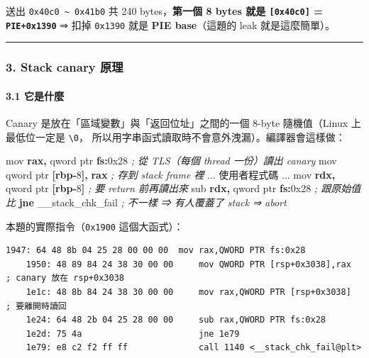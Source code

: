 \documentclass[10pt,a4paper]{article}
\newenvironment{Shaded}{\begin{snugshade}}{\end{snugshade}}
\newcommand{\BaseNTok}[1]{\textcolor[rgb]{0.00,0.00,0.81}{#1}}
\newcommand{\BuiltInTok}[1]{#1}
\newcommand{\CommentTok}[1]{\textcolor[rgb]{0.56,0.35,0.01}{\textit{#1}}}
\newcommand{\ControlFlowTok}[1]{\textcolor[rgb]{0.13,0.29,0.53}{\textbf{#1}}}
\newcommand{\DataTypeTok}[1]{\textcolor[rgb]{0.13,0.29,0.53}{#1}}
\newcommand{\DecValTok}[1]{\textcolor[rgb]{0.00,0.00,0.81}{#1}}
\newcommand{\KeywordTok}[1]{\textcolor[rgb]{0.13,0.29,0.53}{\textbf{#1}}}
\newcommand{\NormalTok}[1]{#1}
\newcommand{\OperatorTok}[1]{\textcolor[rgb]{0.81,0.36,0.00}{\textbf{#1}}}
\renewenvironment{Shaded}{%
  \def\FrameCommand{\fboxsep=3.2pt\colorbox{shadecolor}}%
  \MakeFramed{\advance\hsize-\width\FrameRestore\small}%
}{%
  \endMakeFramed
}
\begin{document}
送出 \texttt{0x40c0\ \allowbreak{}\textasciitilde{}\allowbreak{}\ \allowbreak{}0x41b0} 共 240
bytes，\textbf{第一個 8 bytes 就是 \texttt{{[}0x40c0{]}} =
\texttt{PIE+0x1390}} ⇒ 扣掉 \texttt{0x1390} 就是 \textbf{PIE
base}（這題的 leak 就是這麼簡單）。

\begin{center}\rule{0.5\linewidth}{0.5pt}\end{center}

\subsubsection{3. Stack canary 原理}\label{stack-canary-ux539fux7406}

\paragraph{3.1 它是什麼}\label{ux5b83ux662fux4ec0ux9ebc}

Canary 是放在「區域變數」與「返回位址」之間的一個 8-byte 隨機值（Linux
上最低位一定是 \texttt{\textbackslash{}\allowbreak{}0}，
所以用字串函式讀取時不會意外洩漏）。編譯器會這樣做：

\begin{Shaded}
\begin{Highlighting}[]
\BuiltInTok{mov}  \KeywordTok{rax}\OperatorTok{,} \DataTypeTok{qword} \DataTypeTok{ptr} \KeywordTok{fs}\OperatorTok{:}\BaseNTok{0x28}     \CommentTok{; 從 TLS（每個 thread 一份）讀出 canary}
\BuiltInTok{mov}  \DataTypeTok{qword} \DataTypeTok{ptr} \OperatorTok{[}\KeywordTok{rbp}\OperatorTok{{-}}\DecValTok{8}\OperatorTok{],} \KeywordTok{rax}     \CommentTok{; 存到 stack frame 裡}
\NormalTok{... 使用者程式碼 ...}
\BuiltInTok{mov}  \KeywordTok{rdx}\OperatorTok{,} \DataTypeTok{qword} \DataTypeTok{ptr} \OperatorTok{[}\KeywordTok{rbp}\OperatorTok{{-}}\DecValTok{8}\OperatorTok{]}     \CommentTok{; 要 return 前再讀出來}
\BuiltInTok{sub}  \KeywordTok{rdx}\OperatorTok{,} \DataTypeTok{qword} \DataTypeTok{ptr} \KeywordTok{fs}\OperatorTok{:}\BaseNTok{0x28}     \CommentTok{; 跟原始值比}
\ControlFlowTok{jne}\NormalTok{  \_\_stack\_chk\_fail           }\CommentTok{; 不一樣 ⇒ 有人覆蓋了 stack ⇒ abort}
\end{Highlighting}
\end{Shaded}

本題的實際指令（\texttt{0x1900} 這個大函式）：

\begin{Verbatim}[breaklines=true,breakanywhere=true,breakautoindent=false,fontsize=\fontsize{7.0}{9.5}\selectfont]
    1947: 64 48 8b 04 25 28 00 00 00  mov rax,QWORD PTR fs:0x28
    1950: 48 89 84 24 38 30 00 00     mov QWORD PTR [rsp+0x3038],rax   ; canary 放在 rsp+0x3038
    1e1c: 48 8b 84 24 38 30 00 00     mov rax,QWORD PTR [rsp+0x3038]   ; 要離開時讀回
    1e24: 64 48 2b 04 25 28 00 00     sub rax,QWORD PTR fs:0x28
    1e2d: 75 4a                       jne 1e79
    1e79: e8 c2 f2 ff ff              call 1140 <__stack_chk_fail@plt>
\end{Verbatim}
\end{document}
